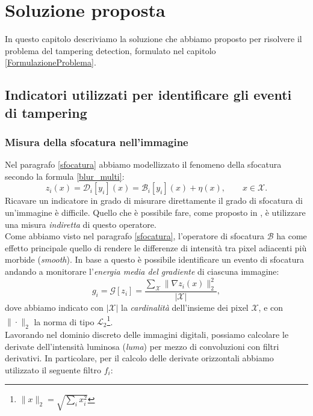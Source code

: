 \chapter{Soluzione proposta}
\label{SoluzioneProposta}
\thispagestyle{empty}

\vspace{0.5cm}

\noindent In questo capitolo descriviamo la soluzione che abbiamo proposto per risolvere il problema del tampering detection, formulato nel capitolo \ref{FormulazioneProblema}.
\section{Indicatori utilizzati per identificare gli eventi di tampering}
\subsection{Misura della sfocatura nell'immagine}
Nel paragrafo \ref{sfocatura} abbiamo modellizzato il fenomeno della sfocatura secondo la formula \eqref{blur_multi}:
\[z_i(x)=\mathcal{D}_i[y_i](x) = \mathcal{B}_i[y_i](x) + \eta(x), \qquad x \in \mathcal{X}.\]
Ricavare un indicatore in grado di misurare direttamente il grado di sfocatura di un'immagine \`e difficile.
Quello che \`e possibile fare, come proposto in \cite{alippi2010detecting}, \`e utilizzare una misura \textit{indiretta} di questo operatore.\\
Come abbiamo visto nel paragrafo \ref{sfocatura}, l'operatore di sfocatura $\mathcal{B}$ ha come effetto principale quello di rendere le differenze di intensit\`a tra pixel adiacenti pi\`u morbide (\textit{smooth}).
In base a questo \`e possibile identificare un evento di sfocatura andando a monitorare l'\textit{energia media del gradiente} di ciascuna immagine:
\begin{equation}
\label{eq:energyGradient}
g_i = \mathcal{G}[z_i] =\frac{\sum_{\mathcal{X}}\| \nabla z_i(x) \| _2^2 }{|\mathcal{X}|} ,
\end{equation}  
dove abbiamo indicato con $|\mathcal{X}|$ la \textit{cardinalit\`a} dell'insieme dei pixel $\mathcal{X}$, e con $\|\cdot\|_2$ la norma di tipo $\mathcal{L}_2$\footnote{$\|x\|_2=\sqrt{\sum_{i}x_i^2}$}.\\
Lavorando nel dominio discreto delle immagini digitali, possiamo calcolare le derivate dell'intensit\`a luminosa (\textit{luma}) per mezzo di convoluzioni con filtri derivativi.
In particolare, per il calcolo delle derivate orizzontali  abbiamo utilizzato il seguente filtro $f_i$:
